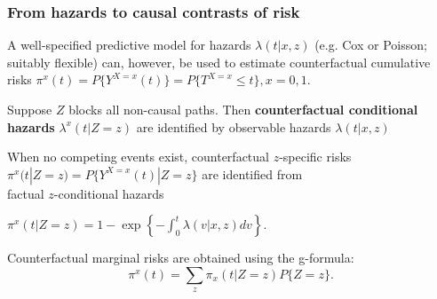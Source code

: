 \documentclass[12pt,dvipsnames,t,aspectratio=169, handout%
]{beamer}
\begin{document}
\begin{frame}
\frametitle{\large From hazards to causal contrasts of risk}
\bi
\item
A well-specified predictive model for hazards $\lambda(t|x,z)$ (e.g.
Cox or Poisson; suitably flexible) can, however, be used 
to estimate counterfactual cumulative risks  %
   $ \pi^x(t) = P\{ Y^{X=x}(t) \} = P\{ T^{X=x} \leq t \}, x=0,1 $. 
\pause
\medskip
\item
Suppose $Z$ blocks all non-causal paths. Then
{\bf counterfactual conditional hazards} 
$\lambda^x(t|Z=z)$ are identified by observable hazards $\lambda(t|x,z)$


\pause
\medskip
\item When no competing events exist,
counterfactual $z$-specific risks $\pi^x(t|Z=z) = P\{ Y^{X=x}(t)|Z=z\} $ are identified from \\
factual $z$-conditional hazards 
\begin{center}
$ \pi^x(t|Z=z) = %
    1 - \exp\left\{-\int_0^t \lambda(v|x,z)dv \right\} . $
\end{center}
\pause
\medskip		
\item		
Counterfactual marginal risks are obtained using the {g-formula}: \\
$$ \pi^x(t) = \sum_z \pi_x(t|Z=z) P\{ Z=z \} . $$

\ei


\end{frame}
\end{document}
